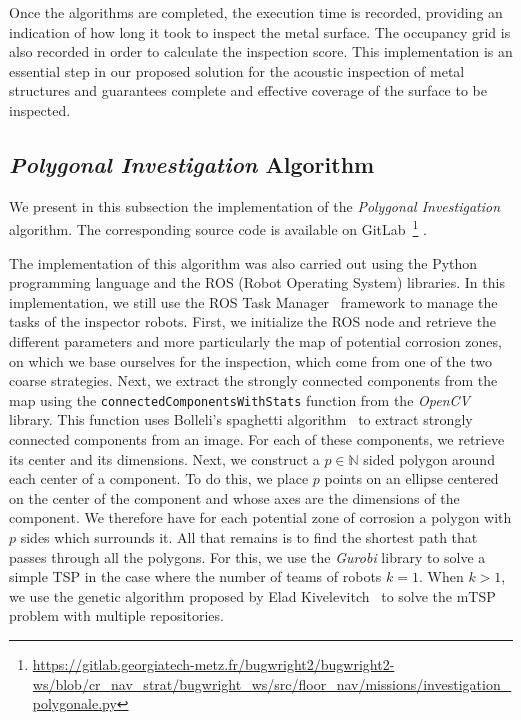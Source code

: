 Once the algorithms are completed, the execution time is recorded, providing an indication of how long it took to inspect the metal surface.
The occupancy grid is also recorded in order to calculate the inspection score.
This implementation is an essential step in our proposed solution for the acoustic inspection of metal structures and guarantees complete and effective coverage of the surface to be inspected.

\subsection*{\textit{Polygonal Investigation} Algorithm}

We present in this subsection the implementation of the \textit{Polygonal Investigation} algorithm.
The corresponding source code is available on GitLab~\footnote{\url{https://gitlab.georgiatech-metz.fr/bugwright2/bugwright2-ws/blob/cr_nav_strat/bugwright_ws/src/floor_nav/missions/investigation_polygonale.py}} .

The implementation of this algorithm was also carried out using the Python programming language and the ROS (Robot Operating System) libraries.
In this implementation, we still use the ROS Task Manager~\cite{ROSTaskManager} framework to manage the tasks of the inspector robots.
First, we initialize the ROS node and retrieve the different parameters and more particularly the map of potential corrosion zones, on which we base ourselves for the inspection, which come from one of the two coarse strategies.
Next, we extract the strongly connected components from the map using the \texttt{connectedComponentsWithStats} function from the \textit{OpenCV} library.
This function uses Bolleli's spaghetti algorithm~\cite{BolelliSpaghetti} to extract strongly connected components from an image.
For each of these components, we retrieve its center and its dimensions.
Next, we construct a $p \in \mathbb{N}$ sided polygon around each center of a component.
To do this, we place $p$ points on an ellipse centered on the center of the component and whose axes are the dimensions of the component.
We therefore have for each potential zone of corrosion a polygon with $p$ sides which surrounds it.
All that remains is to find the shortest path that passes through all the polygons.
For this, we use the \textit{Gurobi} library to solve a simple TSP in the case where the number of teams of robots $k = 1$.
When $k > 1$, we use the genetic algorithm proposed by Elad Kivelevitch~\cite{MDMTSPV_GA} to solve the mTSP problem with multiple repositories.


